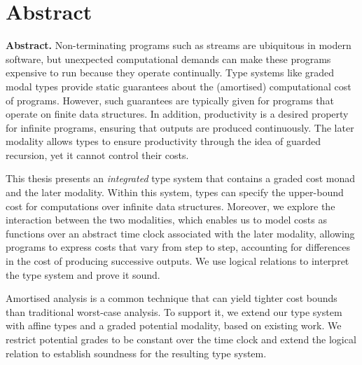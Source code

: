 \ifLongThesisStyle
\chapter*{Abstract}
\else%
\par\bigskip\textbf{Abstract.}
\fi
%
Non-terminating programs such as streams are ubiquitous in modern software, but unexpected computational demands can make these programs expensive to run because they operate continually. Type systems like graded modal types provide static guarantees about the (amortised) computational cost of programs.  However, such guarantees are typically given for programs that operate on finite data structures. In addition, productivity is a desired property for infinite programs, ensuring that outputs are produced continuously. The later modality allows types to ensure productivity through the idea of guarded recursion, yet it cannot control their costs.

This thesis presents an \emph{integrated} type system that contains a graded cost monad and the later modality. Within this system, types can specify the upper-bound cost for computations over infinite data structures. Moreover, we explore the interaction between the two modalities, which enables us to model costs as functions over an abstract time clock associated with the later modality, allowing programs to express costs that vary from step to step, accounting for differences in the cost of producing successive outputs. We use logical relations to interpret the type system and prove it sound.

Amortised analysis is a common technique that can yield tighter cost bounds than traditional worst-case analysis. To support it, we extend our type system with affine types and a graded potential modality, based on existing work. We restrict potential grades to be constant over the time clock and extend the logical relation to establish soundness for the resulting type system.